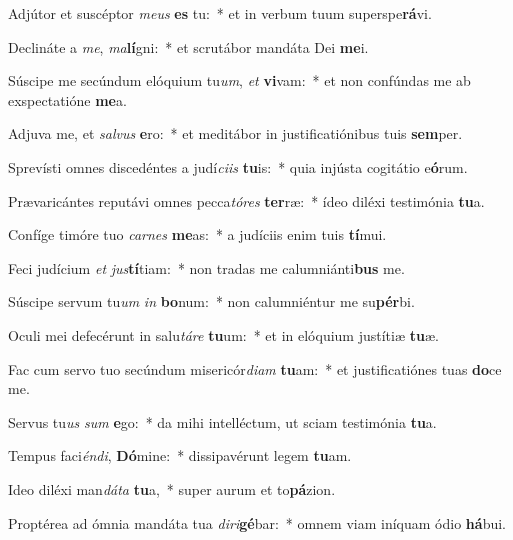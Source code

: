 \item Adjútor et suscéptor \textit{me}\textit{us} \textbf{es} tu:~* et in verbum tuum superspe\textbf{rá}vi.
\item Declináte a \textit{me}, \textit{ma}\textbf{lí}gni:~* et scrutábor mandáta Dei \textbf{me}i.
\item Súscipe me secúndum elóquium tu\textit{um}, \textit{et} \textbf{vi}vam:~* et non confúndas me ab exspectatióne \textbf{me}a.
\item Adjuva me, et \textit{sal}\textit{vus} \textbf{e}ro:~* et meditábor in justificatiónibus tuis \textbf{sem}per.
\item Sprevísti omnes discedéntes a judí\textit{ci}\textit{is} \textbf{tu}is:~* quia injústa cogitátio e\textbf{ó}rum.
\item Prævaricántes reputávi omnes pecca\textit{tó}\textit{res} \textbf{ter}ræ:~* ídeo diléxi testimónia \textbf{tu}a.
\item Confíge timóre tuo \textit{car}\textit{nes} \textbf{me}as:~* a judíciis enim tuis \textbf{tí}mui.
\item Feci judícium \textit{et} \textit{jus}\textbf{tí}tiam:~* non tradas me calumniánti\textbf{bus} me.
\item Súscipe servum tu\textit{um} \textit{in} \textbf{bo}num:~* non calumniéntur me su\textbf{pér}bi.
\item Oculi mei defecérunt in salu\textit{tá}\textit{re} \textbf{tu}um:~* et in elóquium justítiæ \textbf{tu}æ.
\item Fac cum servo tuo secúndum misericór\textit{di}\textit{am} \textbf{tu}am:~* et justificatiónes tuas \textbf{do}ce me.
\item Servus tu\textit{us} \textit{sum} \textbf{e}go:~* da mihi intelléctum, ut sciam testimónia \textbf{tu}a.
\item Tempus faci\textit{én}\textit{di}, \textbf{Dó}mine:~* dissipavérunt legem \textbf{tu}am.
\item Ideo diléxi man\textit{dá}\textit{ta} \textbf{tu}a,~* super aurum et to\textbf{pá}zion.
\item Proptérea ad ómnia mandáta tua \textit{di}\textit{ri}\textbf{gé}bar:~* omnem viam iníquam ódio \textbf{há}bui.
